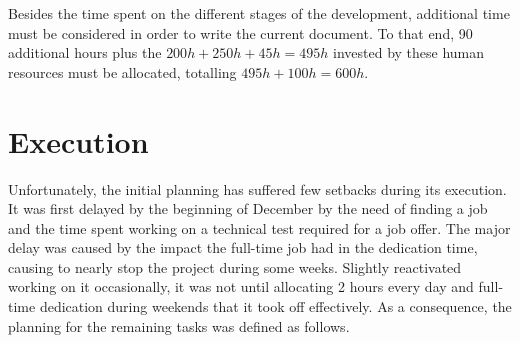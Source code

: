 Besides the time spent on the different stages of the development, additional time must be considered in order to write the current document. To that end, 90 additional hours plus the $200h + 250h + 45h = 495h$ invested by these human resources must be allocated, totalling $495h + 100h = 600h$.

\section{Execution}

Unfortunately, the initial planning has suffered few setbacks during its execution. It was first delayed by the beginning of December by the need of finding a job and the time spent working on a technical test required for a job offer. The major delay was caused by the impact the full-time job had in the dedication time, causing to nearly stop the project during some weeks. Slightly      reactivated working on it occasionally, it was not until allocating 2 hours every day and full-time dedication during weekends that it took off effectively. As a consequence, the planning for the remaining tasks was defined as follows.

